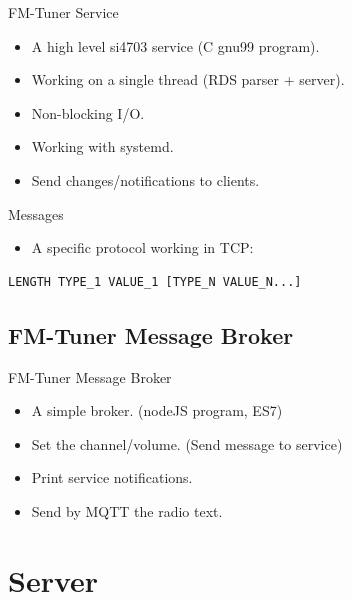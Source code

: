 \documentclass{beamer}
\begin{document}
\begin{frame}[fragile]
	\begin{block}{FM-Tuner Service}
		\begin{itemize}
			\item A high level si4703 service (C gnu99 program).
			\item Working on a single thread (RDS parser + server).
			\item Non-blocking I/O.
			\item Working with systemd.
			\item Send changes/notifications to clients.
		\end{itemize}
	\end{block}
	\begin{block}{Messages}
		\begin{itemize}
			\item A specific protocol working in TCP:
		\end{itemize}
		\begin{center}
			\begin{minipage}{10cm}
				\begin{verbatim}
LENGTH TYPE_1 VALUE_1 [TYPE_N VALUE_N...]
				\end{verbatim}
			\end{minipage}
		\end{center}
	\end{block}
\end{frame}

\subsection{FM-Tuner Message Broker}

\begin{frame}
	\begin{block}{FM-Tuner Message Broker}
		\begin{itemize}
			\item A simple broker. (nodeJS program, ES7)
			\item Set the channel/volume. (Send message to service)
			\item Print service notifications.
			\item Send by MQTT the radio text.
		\end{itemize}
	\end{block}
\end{frame}

\section{Server}
\end{document}
